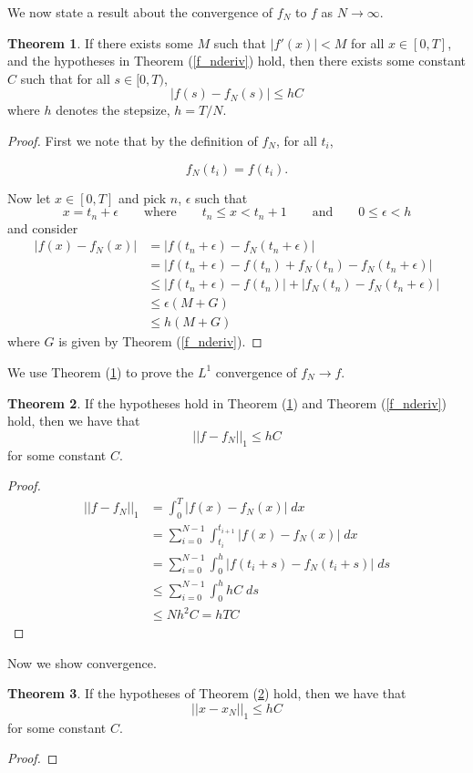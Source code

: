 \documentclass[11pt]{article}
\numberwithin{equation}{section}
\theoremstyle{definition}
\newtheorem{theorem}{Theorem}[section]
\newcommand{\eq}[1]{\begin{align*}#1\end{align*}}
\newcommand{\eqn}[2]{
  \begin{equation}
    \label{#1}
    #2
  \end{equation}
}
\newcommand{\thr}[1]{Theorem (\ref{#1})}
\begin{document}
We now state a result about the convergence of $f_N$ to $f$ as $N \rightarrow \infty$.

\begin{theorem}
  \label{f_dist_bound}
  If there exists some $M$ such that $|f'(x)| < M$ for all $x \in [0, T]$,
  and the hypotheses in \thr{f_nderiv} hold,
  then there exists some constant $C$ such that for all $s \in [0, T)$,
  $$
    |f(s) - f_N(s)|
    \leq
    hC
  $$
  where $h$ denotes the stepsize, $h = T/N$.
\end{theorem}
\begin{proof}
First we note that by the definition of $f_N$, for all $t_i$,
\eqn{f_ndefin_relation}{
  f_N(t_i) = f(t_i).
}
Now let $x \in [0, T]$ and pick $n$, $\epsilon$ such that
$$
  x = t_n + \epsilon
  \qquad
  \text{where}
  \qquad
  t_n \leq x < t_n+1
  \qquad
  \text{and}
  \qquad
  0 \leq \epsilon < h
$$
and consider
\eq{
  |f(x) - f_N(x)| &= |f(t_n + \epsilon) - f_N(t_n + \epsilon)| \\
  &= |f(t_n + \epsilon) - f(t_n) + f_N(t_n) - f_N(t_n + \epsilon)| \\
  &\leq |f(t_n + \epsilon) - f(t_n)| + |f_N(t_n) - f_N(t_n + \epsilon)| \\
  &\leq \epsilon (M + G) \\
  &\leq h(M + G)
}
where $G$ is given by \thr{f_nderiv}.
\end{proof}

We use \thr{f_dist_bound} to prove the $L^1$ convergence of $f_N \rightarrow f$.

\begin{theorem}
  \label{f_convergence}
  If the hypotheses hold in \thr{f_dist_bound} and \thr{f_nderiv} hold,
  then we have that
$$
  || f - f_N ||_1 \leq h C
$$
  for some constant $C$.
\end{theorem}
\begin{proof}
\eq{
  || f - f_N || _1
  &=
  \int_0^T |f(x) - f_N(x) |
  \; dx
  \\
%
%
  &= 
  \sum_{i=0}^{N-1} \int_{t_i}^{t_{i+1}}
  |f(x) - f_N(x)|
  \; dx
  \\
%
%
  &=
  \sum_{i=0}^{N-1}
  \int_0^h |f(t_i + s) - f_N(t_i + s)|
  \; ds
  \\
%
%
  &\leq
  \sum_{i=0}^{N-1}
  \int_0^h hC
  \; ds
  \\
%
%
  &\leq
  Nh^2 C
  =
  hTC
}
\end{proof}
Now we show convergence.
\begin{theorem}
  \label{convergence}
  If the hypotheses of \thr{f_convergence} hold,
  then we have that
$$
  ||x - x_N||_1
  \leq
  hC
$$
  for some constant $C$.
\end{theorem}
\begin{proof}
\end{proof}
\end{document}
